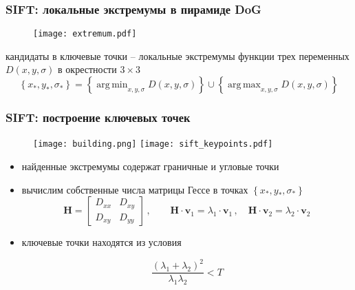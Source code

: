\documentclass[12pt, usepdftitle=false, aspectratio=1610]{beamer}
\DeclareMathOperator*{\argmax}{arg\,max}
\DeclareMathOperator*{\argmin}{arg\,min}
\begin{document}
\begin{frame}
\frametitle{SIFT: локальные экстремумы в пирамиде DoG}
\begin{figure}
    \texttt{[image: extremum.pdf]}
\end{figure}
кандидаты в ключевые точки -- локальные экстремумы функции трех переменных $D(x,y,\sigma)$
в окрестности $3\times3$
$$
    \left\{x_\ast,y_\ast,\sigma_\ast\right\}=
    \left\{\argmin_{x,y,\sigma} D(x,y,\sigma)\right\}
    \cup
    \left\{\argmax_{x,y,\sigma} D(x,y,\sigma)\right\}
$$
\end{frame}

\begin{frame}
\frametitle{SIFT: построение ключевых точек}
\begin{figure}
    \texttt{[image: building.png]}
    \hspace{1cm}
    \texttt{[image: sift\_keypoints.pdf]}
\end{figure}
\begin{itemize}
    \item найденные экстремумы содержат граничные и угловые точки
    \item вычислим собственные  числа матрицы Гессе в точках $\left\{x_\ast,y_\ast,\sigma_\ast\right\}$
    $$
        \mathbf{H}=
        \begin{bmatrix}
        D_{xx} & D_{xy} \\
        D_{xy} & D_{yy}
        \end{bmatrix}\,,
        \qquad
        \mathbf{H}\cdot\mathbf{v}_1=\lambda_1\cdot\mathbf{v}_1\,,
        \quad
        \mathbf{H}\cdot\mathbf{v}_2=\lambda_2\cdot\mathbf{v}_2
    $$
    \item ключевые точки находятся из условия 

  $$
    \frac{(\lambda_1+\lambda_2)^2}{\lambda_1\lambda_2} < T
  $$
\end{itemize}
\end{frame}
\end{document}
